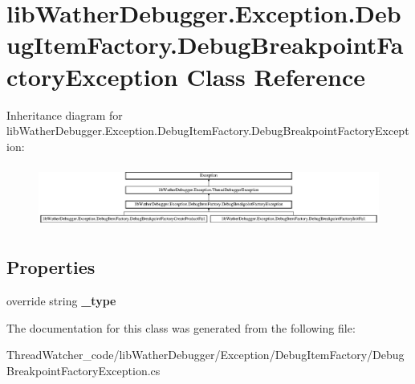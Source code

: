 \hypertarget{classlib_wather_debugger_1_1_exception_1_1_debug_item_factory_1_1_debug_breakpoint_factory_exception}{\section{lib\+Wather\+Debugger.\+Exception.\+Debug\+Item\+Factory.\+Debug\+Breakpoint\+Factory\+Exception Class Reference}
\label{classlib_wather_debugger_1_1_exception_1_1_debug_item_factory_1_1_debug_breakpoint_factory_exception}
}
Inheritance diagram for lib\+Wather\+Debugger.\+Exception.\+Debug\+Item\+Factory.\+Debug\+Breakpoint\+Factory\+Exception\+:\begin{figure}[H]
\begin{center}
\leavevmode
\includegraphics[height=2.062615cm]{classlib_wather_debugger_1_1_exception_1_1_debug_item_factory_1_1_debug_breakpoint_factory_exception}
\end{center}
\end{figure}
\subsection*{Properties}
\begin{DoxyCompactItemize}
\item 
\hypertarget{classlib_wather_debugger_1_1_exception_1_1_debug_item_factory_1_1_debug_breakpoint_factory_exception_a84b1d0bf909f1c910ecbe0ba537ff3e4}{override string {\bfseries \+\_\+type}}\label{classlib_wather_debugger_1_1_exception_1_1_debug_item_factory_1_1_debug_breakpoint_factory_exception_a84b1d0bf909f1c910ecbe0ba537ff3e4}

\end{DoxyCompactItemize}


The documentation for this class was generated from the following file\+:\begin{DoxyCompactItemize}
\item 
Thread\+Watcher\+\_\+code/lib\+Wather\+Debugger/\+Exception/\+Debug\+Item\+Factory/Debug\+Breakpoint\+Factory\+Exception.\+cs\end{DoxyCompactItemize}
